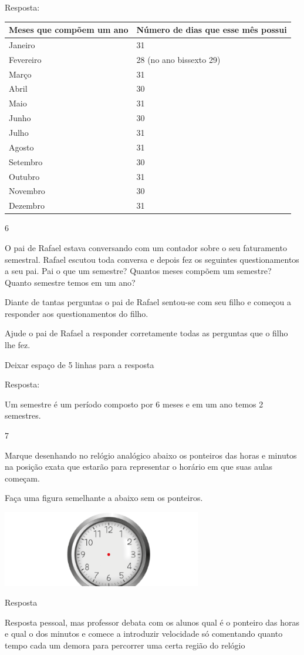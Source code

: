 \begin{escolha}
Resposta:

\begin{longtable}[]{@{}ll@{}}
\toprule
Meses que compõem um ano & Número de dias que esse mês
possui\tabularnewline
\midrule
\endhead
Janeiro & 31\tabularnewline
Fevereiro & 28 (no ano bissexto 29)\tabularnewline
Março & 31\tabularnewline
Abril & 30\tabularnewline
Maio & 31\tabularnewline
Junho & 30\tabularnewline
Julho & 31\tabularnewline
Agosto & 31\tabularnewline
Setembro & 30\tabularnewline
Outubro & 31\tabularnewline
Novembro & 30\tabularnewline
Dezembro & 31\tabularnewline
\bottomrule
\end{longtable}

\num{6}

O pai de Rafael estava conversando com um contador sobre o seu
faturamento semestral. Rafael escutou toda conversa e depois fez os
seguintes questionamentos a seu pai. Pai o que um semestre? Quantos
meses compõem um semestre? Quanto semestre temos em um ano?

Diante de tantas perguntas o pai de Rafael sentou-se com seu filho e
começou a responder aos questionamentos do filho.

Ajude o pai de Rafael a responder corretamente todas as perguntas que o
filho lhe fez.

Deixar espaço de 5 linhas para a resposta

Resposta:

Um semestre é um período composto por 6 meses e em um ano temos 2
semestres.

\num{7}

Marque desenhando no relógio analógico abaixo os ponteiros das horas e
minutos na posição exata que estarão para representar o horário em que
suas aulas começam.

Faça uma figura semelhante a abaixo sem os ponteiros.

\includegraphics[width=3.42530in,height=1.30845in]{media/image48.png}

Resposta

Resposta pessoal, mas professor debata com os alunos qual é o ponteiro
das horas e qual o dos minutos e comece a introduzir velocidade só
comentando quanto tempo cada um demora para percorrer uma certa região
do relógio


\end{escolha}
